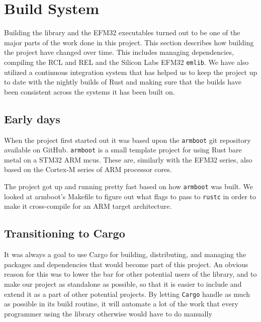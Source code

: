 \section{Build System}
\label{sec:build_system}

Building the library and the EFM32 executables turned out to be one of the major parts of the work done in this project.
This section describes how building the project have changed over time.
This includes managing dependencies, compiling the RCL and REL and the Silicon Labs EFM32 \texttt{emlib}.
We have also utilized a continuous integration system that has helped us to keep the project up to date with the nightly builds of Rust and making sure that the builds have been consistent across the systems it has been built on.

\subsection{Early days}
\label{ssub:using_make}

When the project first started out it was based upon the \texttt{armboot} \cite{github:armboot} git repository available on GitHub.
\texttt{armboot} is a small template project for using Rust bare metal on a STM32 ARM \glspl{mcu}.
These are, similarly with the EFM32 series, also based on the Cortex-M series of ARM processor cores.

The project got up and running pretty fast based on how \texttt{armboot} was built.
We looked at armboot's Makefile to figure out what flags to pass to \texttt{rustc} in order to make it cross-compile for an ARM target architecture.

\subsection{Transitioning to Cargo}
\label{ssub:transitioning_to_cargo}

It was always a goal to use Cargo for building, distributing, and managing the packages and dependencies that would become part of this project.
An obvious reason for this was to lower the bar for other potential users of the library, and to make our project as standalone as possible, so that it is easier to include and extend it as a part of other potential projects.
By letting \texttt{Cargo} handle as much as possible in its build routine, it will automate a lot of the work that every programmer using the library otherwise would have to do manually

